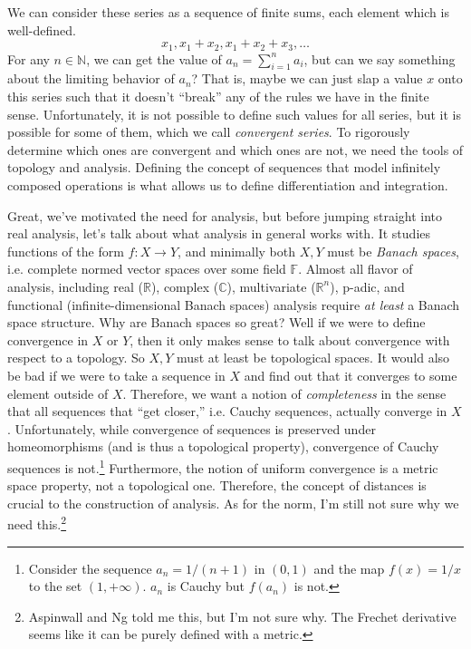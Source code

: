 \documentclass{article}
\begin{document}
  We can consider these series as a sequence of finite sums, each element which is well-defined. 
  \begin{equation}
    x_1, x_1 + x_2, x_1 + x_2 + x_3, \ldots
  \end{equation} 
  For any $n \in \mathbb{N}$, we can get the value of $a_n = \sum_{i=1}^n a_i$, but can we say something about the limiting behavior of $a_n$? That is, maybe we can just slap a value $x$ onto this series such that it doesn't ``break'' any of the rules we have in the finite sense. Unfortunately, it is not possible to define such values for all series, but it is possible for some of them, which we call \textit{convergent series}. To rigorously determine which ones are convergent and which ones are not, we need the tools of topology and analysis. Defining the concept of sequences that model infinitely composed operations is what allows us to define differentiation and integration. 

  Great, we've motivated the need for analysis, but before jumping straight into real analysis, let's talk about what analysis in general works with. It studies functions of the form $f: X \rightarrow Y$, and minimally both $X, Y$ must be \textit{Banach spaces}, i.e. complete normed vector spaces over some field $\mathbb{F}$. Almost all flavor of analysis, including real ($\mathbb{R}$), complex ($\mathbb{C}$), multivariate ($\mathbb{R}^n$), p-adic, and functional (infinite-dimensional Banach spaces) analysis require \textit{at least} a Banach space structure. Why are Banach spaces so great? Well if we were to define convergence in $X$ or $Y$, then it only makes sense to talk about convergence with respect to a topology. So $X, Y$ must at least be topological spaces. It would also be bad if we were to take a sequence in $X$ and find out that it converges to some element outside of $X$. Therefore, we want a notion of \textit{completeness} in the sense that all sequences that ``get closer,'' i.e. Cauchy sequences, actually converge in $X$. Unfortunately, while convergence of sequences is preserved under homeomorphisms (and is thus a topological property), convergence of Cauchy sequences is not.\footnote{Consider the sequence $a_n = 1/(n+1)$ in $(0, 1)$ and the map $f(x) = 1/x$ to the set $(1, +\infty)$. $a_n$ is Cauchy but $f(a_n)$ is not.} Furthermore, the notion of uniform convergence is a metric space property, not a topological one. Therefore, the concept of distances is crucial to the construction of analysis. As for the norm, I'm still not sure why we need this.\footnote{Aspinwall and Ng told me this, but I'm not sure why. The Frechet derivative seems like it can be purely defined with a metric. } 
\end{document}
